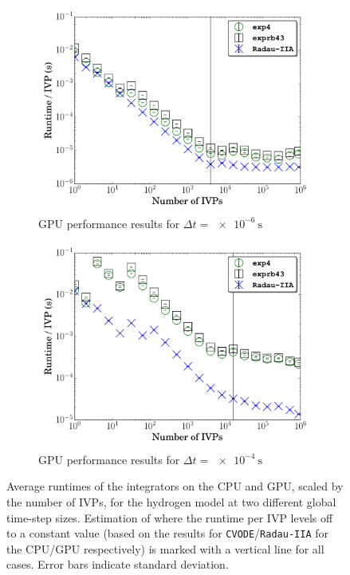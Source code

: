 \documentclass[preprint,review,11pt]{elsarticle}
\begin{document}
\begin{figure}[htbp]
\begin{subfigure}{0.49\textwidth}
      \includegraphics[width=\linewidth]{H2_1e-06_gpu.pdf}
      \caption{GPU performance results for $\Delta t = \SI{e-6}{\second}$}
      \label{F:h2_gpu_perf_small}
  \end{subfigure}
  \begin{subfigure}{0.49\textwidth}
      \includegraphics[width=\linewidth]{H2_1e-04_gpu.pdf}
      \caption{GPU performance results for $\Delta t = \SI{e-4}{\second}$}
      \label{F:h2_gpu_perf_large}
  \end{subfigure}
  \caption{Average runtimes of the integrators on the CPU and GPU, scaled by the number of IVPs, for the hydrogen model at two different global time-step sizes.
  Estimation of where the runtime per IVP levels off to a constant value (based on the results for \texttt{CVODE}\slash\texttt{Radau-IIA} for the CPU\slash GPU respectively) is marked with a vertical line for all cases.
  Error bars indicate standard deviation.}
  \label{F:H2_perf}
\end{figure}
\end{document}
